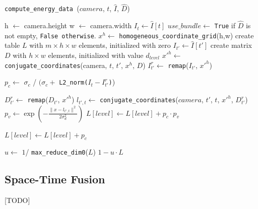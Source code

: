 \documentclass[notitlepage,english]{hgbreport}
\begin{document}
\begin{algorithm}[h]
	\caption{\texttt{compute\_energy\_data }($camera$, $t$, $\hat I$, $\hat D$)}
	\label{alg:energy_data}
	\begin{algorithmic}[1]
		\State h $\leftarrow$ camera.height
		\State w $\leftarrow$ camera.width
		\State $I_t \leftarrow \hat I[ t ]$
		\State $use\_bundle\leftarrow $ \texttt{True} if $\hat D$ is not empty, \texttt{False otherwise}.
		\State
		\State $x^h \leftarrow$ \texttt{homogeneous\_coordinate\_grid}(h,w)
		\State create table $L$ with $m\times h \times w$ elements, initialized with zero
		\State
		\State $I_{t'} \leftarrow \hat I[ t' ]$
		\State create matrix $D$ with $h \times w$ elements, initialized with value $d_{level}$
		\State $x'^h\leftarrow$ \texttt{conjugate\_coordinates}(camera, $t$,  $t'$, $x^h$, $D$)
		\State $I^r_{t'} \leftarrow$ \texttt{remap}($I_{t'}$, $x'^h$)

		\State $p_c \leftarrow$  $\sigma_c$ / $(\sigma_c +$ \texttt{L2\_norm($I_t - I^r_{t'}$)})
		\State

		
			\State $D^r_{t'} \leftarrow$ \texttt{remap}($D_{t'}$, $x'^h$)
			\State $l_{t',t}\leftarrow$ \texttt{conjugate\_coordinates}($camera$, $t'$,  $t$, $x'^h$, $D^r_{t'}$)
			\State $p_v \leftarrow \exp\left(-\frac{\lVert x - l_{t',t} \rVert^2} {2\sigma_d^2} \right)$
			\State $L[level] \leftarrow L[level] + p_c\cdot p_v$


		\Else
			\State $L[level] \leftarrow L[level] + p_c$
		\EndIf

		\EndFor
		\EndFor
		\State
		\State $u \leftarrow$ $1$/ \texttt{max\_reduce\_dim0}($L$)
		\State \Return $1 - u\cdot L$
	\end{algorithmic}
\end{algorithm}

\subsection{Space-Time Fusion}
[TODO]


\end{document}
